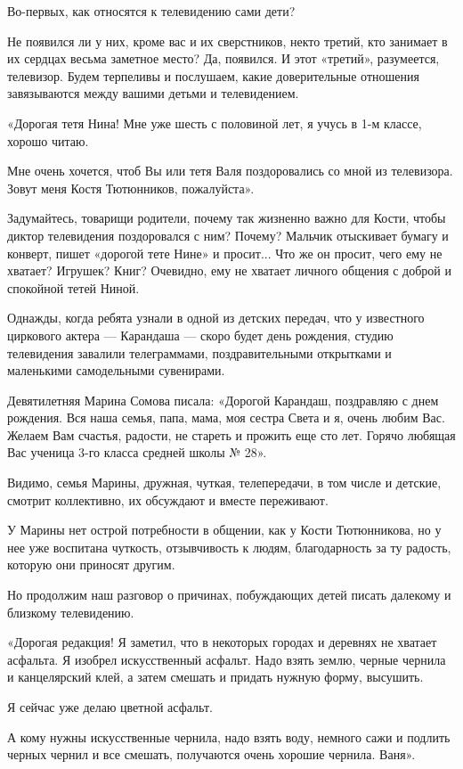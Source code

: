 \documentclass[12pt, a4paper, openany]{book}
\begin{document}
Во-первых, как относятся к телевидению сами дети? 

Не появился ли у них, кроме вас и их сверстников, некто третий, кто занимает в их сердцах весьма заметное место? Да, появился. И этот «третий», разумеется, телевизор. Будем терпеливы и послушаем, какие доверительные отношения завязываются между вашими детьми и телевидением. 

«Дорогая тетя Нина! Мне уже шесть с половиной лет, я учусь в 1-м классе, хорошо читаю. 

Мне очень хочется, чтоб Вы или тетя Валя поздоровались со мной из телевизора. Зовут меня Костя Тютюнников, пожалуйста». 

Задумайтесь, товарищи родители, почему так жизненно важно для Кости, чтобы диктор телевидения поздоровался с ним? Почему? Мальчик отыскивает бумагу и конверт, пишет «дорогой тете Нине» и просит... Что же он просит, чего ему не хватает? Игрушек? Книг? Очевидно, ему не хватает личного общения с доброй и спокойной тетей Ниной. 

Однажды, когда ребята узнали в одной из детских передач, что у известного циркового актера — Карандаша — скоро будет день рождения, студию телевидения завалили телеграммами, поздравительными открытками и маленькими самодельными сувенирами. 

Девятилетняя Марина Сомова писала: «Дорогой Карандаш, поздравляю с днем рождения. Вся наша семья, папа, мама, моя сестра Света и я, очень любим Вас. Желаем Вам счастья, радости, не стареть и прожить еще сто лет. Горячо любящая Вас ученица 3-го класса средней школы № 28». 

Видимо, семья Марины, дружная, чуткая, телепередачи, в том числе и детские, смотрит коллективно, их обсуждают и вместе переживают. 

У Марины нет острой потребности в общении, как у Кости Тютюнникова, но у нее уже воспитана чуткость, отзывчивость к людям, благодарность за ту радость, которую они приносят другим. 

Но продолжим наш разговор о причинах, побуждающих детей писать далекому и близкому телевидению. 

«Дорогая редакция! Я заметил, что в некоторых городах и деревнях не хватает асфальта. Я изобрел искусственный асфальт. Надо взять землю, черные чернила и канцелярский клей, а затем смешать и придать нужную форму, высушить. 

Я сейчас уже делаю цветной асфальт. 

А кому нужны искусственные чернила, надо взять воду, немного сажи и подлить черных чернил и все смешать, получаются очень хорошие чернила. Ваня». 
\end{document}
